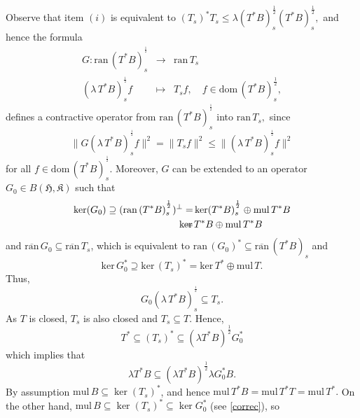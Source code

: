 \documentclass{amsart}
\makeatletter
\newcommand{\n}{\|}
\newcommand{\h}{\mathfrak{H}}
\newcommand{\kk}{\mathfrak{K}}
\newcommand{\mul}{\mathrm{mul} \, }
\newcommand{\kerr}{\mathrm{ker}\,}
\newcommand{\ran}{\mathrm{ran}\,}
\newcommand{\ranbar}{\overline{\mathrm{ran}}\,}
\newcommand{\bhk}{B(\h,\kk)}
\newcommand{\D}{\mathrm{dom}\,}
\newcommand{\adj}{^*}
\newcommand{\ts}{T_s}
\newcommand{\tstar}{T^{*}}
\newcommand{\half}{^{\frac{1}{2}}}
\newcommand{\halfltsb}{(\lambda  T^*B)^{\frac{1}{2}}}
\newcommand{\halftsb}{( T^*B)^{\frac{1}{2}}}
\newcommand{\halfltsbs}{ (\lambda \,  \tstar B)^{\half}_s }
\newcommand{\halftsbs}{ ( \tstar B)^{\half}_s }
\newcommand{\orth}{^\perp}
\newcommand{\inclu}{\subseteq}
\numberwithin{equation}{section}
\renewenvironment{proof}[1][\proofname]{%
   \par\pushQED{\qed}\normalfont%
   \topsep6\p@\@plus6\p@\relax
   \trivlist\item[\hskip\labelsep\bfseries#1\@addpunct{.}]%
   \ignorespaces
}{%
   \popQED\endtrivlist\@endpefalse
}
\makeatother
\begin{document}
\begin{proof}
  Observe that  item $(i)$  is equivalent to $(\ts)\adj \ts \leq \lambda \halftsb_s \halftsb_s ,$ and hence the formula
          $$
            \begin{array}{rcl}
                G: \ran   (\tstar B)^{\half}_s & \longrightarrow & \ran T_s \\
                 \halfltsbs  f               & \longmapsto &  T_s f,  \quad f \in \D (\tstar B)^{\frac{1}{2}}_s,
           \end{array}
           $$
   defines a contractive operator from $\ran (\tstar B)^{\half}_s$ into $\ran\ts,$ since
   $$
   \n G  \halfltsbs f \n^2 =
    \n  T_s f \|^2 \leq \n \halfltsbs  f \|^2
    $$
    for all $f \in \D   \halftsbs.$
   Moreover, $G $ can be extended to an operator $G_0 \in \bhk$ such that
   \begin{eqnarray}\label{formulakerg}
     \ker( G_0 )\supseteq  ( \ran     \halftsbs )\orth
      = & \ker     \halftsbs  \oplus \mul\tstar B  \nonumber \\
      = & \hspace*{-0.5cm} \kerr   \tstar B \oplus \mul\tstar B
   \end{eqnarray}
   and    $\ranbar G_0 \inclu \ranbar \ts $, which is equivalent to
   $\ran (G_0)\adj \inclu \ranbar(\tstar B)_s$ and
    \begin{equation}\label{correc}
      \kerr   G_0\adj \supseteq\kerr   (\ts)\adj=  \kerr   \tstar \oplus \mul T.
    \end{equation}
   Thus,
   \begin{equation}\label{otherprof}
     G_0   \halfltsbs \inclu T_s.
   \end{equation}
  As $T$  is closed, $\ts$ is also closed and $\ts \inclu T.$ Hence,
  \begin{equation*}\label{other5}
  \tstar \inclu (\ts)\adj \inclu      \halfltsb   G_0\adj
  \end{equation*}
  which implies that
  \begin{equation}\label{other55}
  \lambda \tstar B \inclu \halfltsb \lambda G_0\adj B.
 \end{equation}
  By assumption $\mul B \inclu \ker (\ts)\adj$, and hence $\mul \tstar B = \mul \tstar T = \mul \tstar.$    On the other hand,   $\mul B \inclu \ker (\ts)\adj \inclu \ker   G_0\adj$ (see \eqref{correc}), so

\end{proof}
\end{document}
